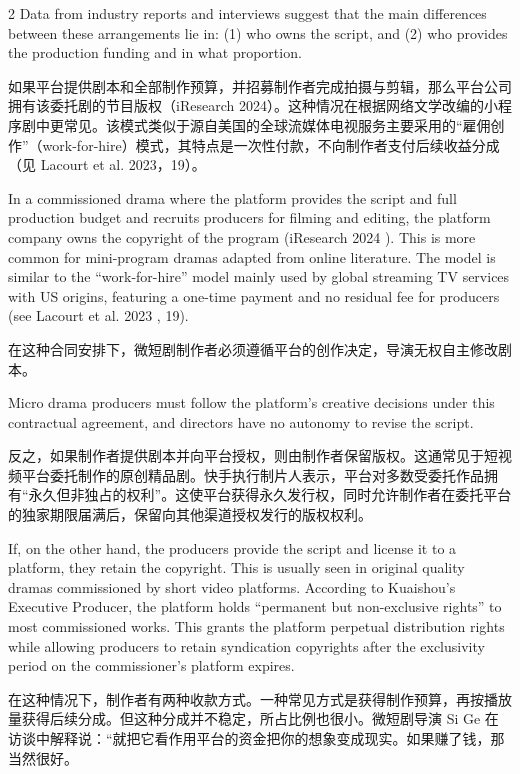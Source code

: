 \documentclass[10pt,a4paper]{article}
\begin{document}
\begin{paracol}{2}
\switchcolumn
Data from industry reports and interviews suggest that the main differences between these arrangements lie in: (1) who owns the script, and (2) who provides the production funding and in what proportion.\par
\switchcolumn*
如果平台提供剧本和全部制作预算，并招募制作者完成拍摄与剪辑，那么平台公司拥有该委托剧的节目版权（iResearch 2024）。这种情况在根据网络文学改编的小程序剧中更常见。该模式类似于源自美国的全球流媒体电视服务主要采用的“雇佣创作”（work-for-hire）模式，其特点是一次性付款，不向制作者支付后续收益分成（见 Lacourt et al. 2023，19）。\par
\switchcolumn
In a commissioned drama where the platform provides the script and full production budget and recruits producers for filming and editing, the platform company owns the copyright of the program (iResearch 2024 ). This is more common for mini-program dramas adapted from online literature. The model is similar to the “work-for-hire” model mainly used by global streaming TV services with US origins, featuring a one-time payment and no residual fee for producers (see Lacourt et al. 2023 , 19).\par
\switchcolumn*
在这种合同安排下，微短剧制作者必须遵循平台的创作决定，导演无权自主修改剧本。\par
\switchcolumn
Micro drama producers must follow the platform’s creative decisions under this contractual agreement, and directors have no autonomy to revise the script.\par
\switchcolumn*
反之，如果制作者提供剧本并向平台授权，则由制作者保留版权。这通常见于短视频平台委托制作的原创精品剧。快手执行制片人表示，平台对多数受委托作品拥有“永久但非独占的权利”。这使平台获得永久发行权，同时允许制作者在委托平台的独家期限届满后，保留向其他渠道授权发行的版权权利。\par
\switchcolumn
If, on the other hand, the producers provide the script and license it to a platform, they retain the copyright. This is usually seen in original quality dramas commissioned by short video platforms. According to Kuaishou’s Executive Producer, the platform holds “permanent but non-exclusive rights” to most commissioned works. This grants the platform perpetual distribution rights while allowing producers to retain syndication copyrights after the exclusivity period on the commissioner’s platform expires.\par
\switchcolumn*
在这种情况下，制作者有两种收款方式。一种常见方式是获得制作预算，再按播放量获得后续分成。但这种分成并不稳定，所占比例也很小。微短剧导演 Si Ge 在访谈中解释说：“就把它看作用平台的资金把你的想象变成现实。如果赚了钱，那当然很好。\par

\end{paracol}
\end{document}
